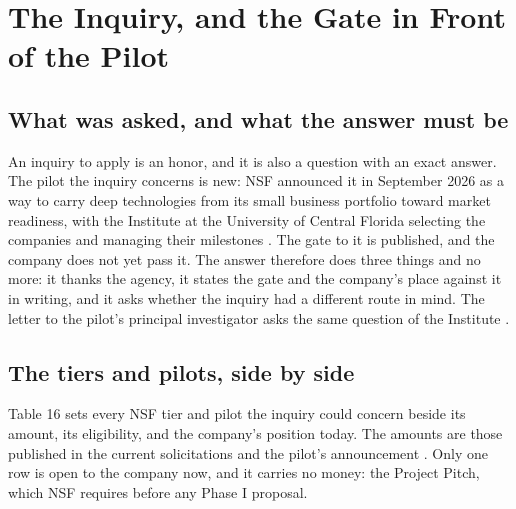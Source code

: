 \section{The Inquiry, and the Gate in Front of the Pilot}

\subsection{What was asked, and what the answer must be}

An inquiry to apply is an honor, and it is also a question with an exact
answer. The pilot the inquiry concerns is new: NSF announced it in September
2026 as a way to carry deep technologies from its small business portfolio
toward market readiness, with the Institute at the University of Central Florida
selecting the companies and managing their milestones \cite{nsfncti2026}. The
gate to it is published, and the company does not yet pass it. The answer
therefore does three things and no more: it thanks the agency, it states the
gate and the company's place against it in writing, and it asks whether the
inquiry had a different route in mind. The letter to the pilot's principal
investigator asks the same question of the Institute \cite{nctiucf2026}.

\subsection{The tiers and pilots, side by side}

Table 16 sets every NSF tier and pilot the inquiry could concern beside its
amount, its eligibility, and the company's position today. The amounts are
those published in the current solicitations and the pilot's announcement
\cite{nsf26510,nsf26511,nsfncti2026}. Only one row is open to the company now,
and it carries no money: the Project Pitch, which NSF requires before any
Phase I proposal.

